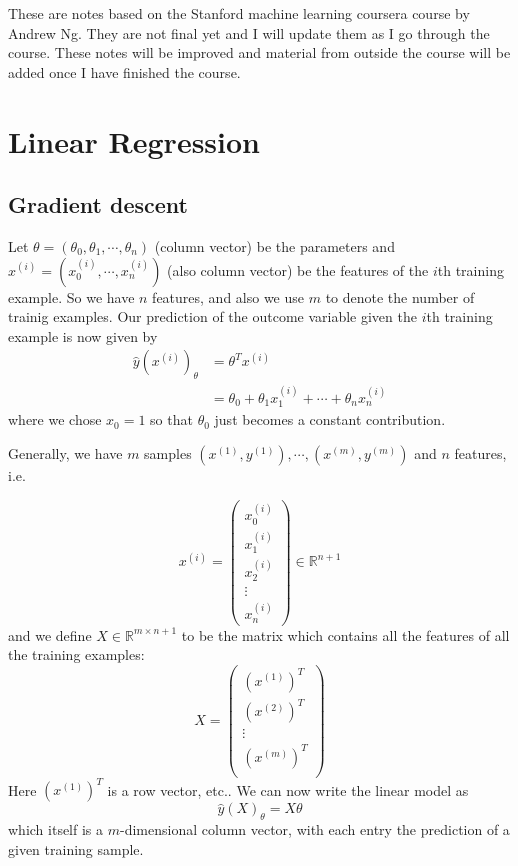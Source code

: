 \documentclass[a4paper, 10pt,hidelinks]{article}
\newcommand{\upi}[1]{#1^{(i)}}
\newcommand{\R}{\mathbb{R}}
\begin{document}
These are notes based on the Stanford machine learning coursera course by Andrew Ng. They are not final yet and I will update them as I go through the course. These notes will be improved and material from outside the course will be added once I have finished the course.

\section{Linear Regression}
\subsection{Gradient descent}
Let $\theta = (\theta_0, \theta_1, \cdots, \theta_n)$ (column vector) be the parameters and $x^{(i)} = (x^{(i)}_0, \cdots, x^{(i)}_n)$ (also column vector) be the features of the $i$th training example. So we have $n$ features, and also we use $m$ to denote the number of trainig examples.  Our prediction of the outcome variable given the $i$th training example is now given by
\begin{align}
\hat{y}(\upi{x})_{\theta} &= \theta^T \upi{x} \nonumber \\
&= \theta_0 + \theta_1 \upi{x}_1 + \cdots + \theta_n \upi{x}_n
\end{align}
where we chose $x_0 = 1$ so that $\theta_0$ just becomes a constant contribution. 

Generally, we have $m$ samples $(x^{(1)}, y^{(1)}), \cdots, (x^{(m)}, y^{(m)})$ and $n$ features, i.e. 

\begin{equation}
\upi{x} = \begin{pmatrix}
\upi{x_0} \\ 
\upi{x_1} \\ 
\upi{x_2} \\
\vdots \\
\upi{x_n}
\end{pmatrix} \in \R^{n + 1}
\end{equation}
and we define $X \in \R^{m \times n+ 1}$  to be the matrix which contains all the features of all the training examples:
\begin{equation}\label{Eq: Definition X matrix}
X = \begin{pmatrix}
(x^{(1)})^T \\
(x^{(2)})^T \\
\vdots \\
(x^{(m)})^T \\
\end{pmatrix}
\end{equation}
Here $(x^{(1)})^T$ is a row vector, etc.. We can now write the linear model as
\begin{equation}
\hat{y}(X)_{\theta} = X \theta
\end{equation}
which itself is a $m$-dimensional column vector, with each entry the prediction of a given training sample. 
\end{document}

